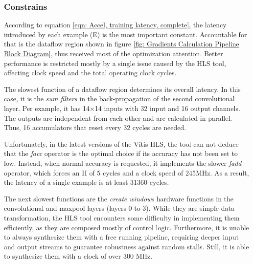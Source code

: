 \subsubsection{Constrains}
According to equation \ref{eqn: Accel, training latency, complete}, the latency introduced by each example (E) is the most important constant. Accountable for that is the dataflow region shown in figure \ref{fig: Gradients Calculation Pipeline Block Diagram}, thus received most of the optimization attention. Better performance is restricted mostly by a single issue caused by the HLS tool, affecting clock speed and the total operating clock cycles. %

The slowest function of a dataflow region determines its overall latency. In this case, it is the \textit{sum filters} in the back-propagation of the second convolutional layer. Per example, it has 14$\times$14 inputs with 32 input and 16 output channels. The outputs are independent from each other and are calculated in parallel. Thus, 16 accumulators that reset every 32 cycles are needed. %

Unfortunately, in the latest versions of the Vitis HLS, the tool can not deduce that the \textit{facc} operator is the optimal choice if its accuracy has not been set to low. Instead, when normal accuracy is requested, it implements the slower \textit{fadd} operator, which forces an II of 5 cycles and a clock speed of 245MHz. As a result, the latency of a single example is at least 31360 cycles. %

The next slowest functions are the \textit{create windows} hardware functions in the convolutional and maxpool layers (layers 0 to 3). While they are simple data transformation, the HLS tool encounters some difficulty in implementing them efficiently, as they are composed mostly of control logic. Furthermore, it is unable to always synthesize them with a free running pipeline, requiring deeper input and output streams to guarantee robustness against random stalls. Still, it is able to synthesize them with a clock of over 300 MHz. %


